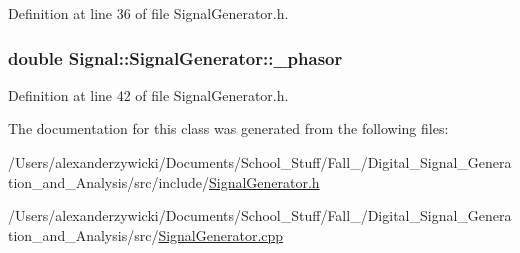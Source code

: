 Definition at line 36 of file Signal\+Generator.\+h.

\hypertarget{classSignal_1_1SignalGenerator_af4aa0728ded00777be26a06d883eaeb3}{
\subsubsection[{\+\_\+phasor}]{\setlength{\rightskip}{0pt plus 5cm}double Signal\+::\+Signal\+Generator\+::\+\_\+phasor\hspace{0.3cm}{\ttfamily [protected]}}}\label{classSignal_1_1SignalGenerator_af4aa0728ded00777be26a06d883eaeb3}


Definition at line 42 of file Signal\+Generator.\+h.



The documentation for this class was generated from the following files\+:\begin{DoxyCompactItemize}
\item 
/\+Users/alexanderzywicki/\+Documents/\+School\+\_\+\+Stuff/\+Fall\+\_/\+Digital\+\_\+\+Signal\+\_\+\+Generation\+\_\+and\+\_\+\+Analysis/src/include/\hyperlink{SignalGenerator_8h}{Signal\+Generator.\+h}\item 
/\+Users/alexanderzywicki/\+Documents/\+School\+\_\+\+Stuff/\+Fall\+\_/\+Digital\+\_\+\+Signal\+\_\+\+Generation\+\_\+and\+\_\+\+Analysis/src/\hyperlink{SignalGenerator_8cpp}{Signal\+Generator.\+cpp}\end{DoxyCompactItemize}
